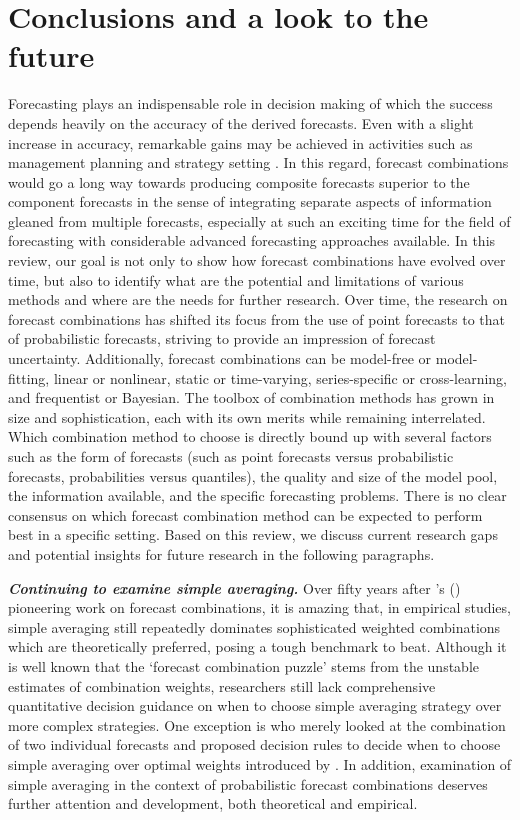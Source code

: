 \documentclass[11pt]{article}
\def\citeapos#1{\citeauthor{#1}'s (\citeyear{#1})}
\begin{document}
\section{Conclusions and a look to the future}
\label{sec:conclusion}

Forecasting plays an indispensable role in decision making of which the success depends heavily on the accuracy of the derived forecasts. Even with a slight increase in accuracy, remarkable gains may be achieved in activities such as management planning and strategy setting \citep{Makridakis1996-cf,Syntetos2009-ho,Hyndman2021-tx,Petropoulos2021-ft}. In this regard, forecast combinations would go a long way towards producing composite forecasts superior to the component forecasts in the sense of integrating separate aspects of information gleaned from multiple forecasts, especially at such an exciting time for the field of forecasting with considerable advanced forecasting approaches available. In this review, our goal is not only to show how forecast combinations have evolved over time, but also to identify what are the potential and limitations of various methods and where are the needs for further research. Over time, the research on forecast combinations has shifted its focus from the use of point forecasts to that of probabilistic forecasts, striving to provide an impression of forecast uncertainty. Additionally, forecast combinations can be model-free or model-fitting, linear or nonlinear, static or time-varying, series-specific or cross-learning, and frequentist or Bayesian. The toolbox of combination methods has grown in size and sophistication, each with its own merits while remaining interrelated. Which combination method to choose is directly bound up with several factors such as the form of forecasts (such as point forecasts versus probabilistic forecasts, probabilities versus quantiles), the quality and size of the model pool, the information available, and the specific forecasting problems. There is no clear consensus on which forecast combination method can be expected to perform best in a specific setting. Based on this review, we discuss current research gaps and potential insights for future research in the following paragraphs.

\textbf{\textit{Continuing to examine simple averaging.}} Over fifty years after \citeapos{Bates1969-yj} pioneering work on forecast combinations, it is amazing that, in empirical studies, simple averaging still repeatedly dominates sophisticated weighted combinations which are theoretically preferred, posing a tough benchmark to beat. Although it is well known that the `forecast combination puzzle' stems from the unstable estimates of combination weights, researchers still lack comprehensive quantitative decision guidance on when to choose simple averaging strategy over more complex strategies. One exception is \cite{Blanc2016-sn} who merely looked at the combination of two individual forecasts and proposed decision rules to decide when to choose simple averaging over optimal weights introduced by \cite{Bates1969-yj}. In addition, examination of simple averaging in the context of probabilistic forecast combinations deserves further attention and development, both theoretical and empirical.
\end{document}
